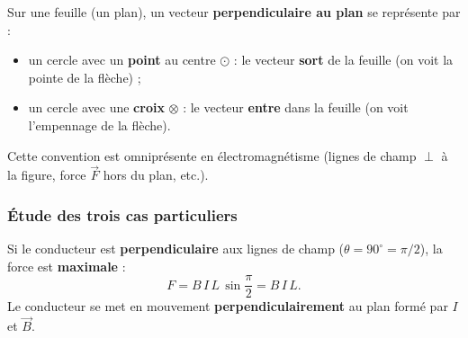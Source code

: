 \documentclass[11pt,a4paper]{article}
\newcommand{\Bvec}{\vec{B}}
\newcommand{\Fvec}{\vec{F}}
\begin{document}
\begin{center}
\end{center}

\begin{remarque}
Sur une feuille (un plan), un vecteur \textbf{perpendiculaire au plan} se représente par :
\begin{itemize}[leftmargin=1.6em,topsep=2pt,itemsep=1pt]
  \item un cercle avec un \textbf{point} au centre $\odot$ : le vecteur \textbf{sort} de la feuille
        (on voit la pointe de la flèche) ;
  \item un cercle avec une \textbf{croix} $\otimes$ : le vecteur \textbf{entre} dans la feuille
        (on voit l'empennage de la flèche).
\end{itemize}
Cette convention est omniprésente en électromagnétisme (lignes de champ $\perp$ à la figure,
force $\Fvec$ hors du plan, etc.).
\end{remarque}

\subsubsection{Étude des trois cas particuliers}

\begin{theoreme}
Si le conducteur est \textbf{perpendiculaire} aux lignes de champ ($\theta=90^\circ=\pi/2$), la
force est \textbf{maximale} :
\[ F = B\, I\, L\,\sin\dfrac{\pi}{2} = B\, I\, L. \]
Le conducteur se met en mouvement \textbf{perpendiculairement} au plan formé par $I$ et $\Bvec$.
\end{theoreme}
\end{document}
